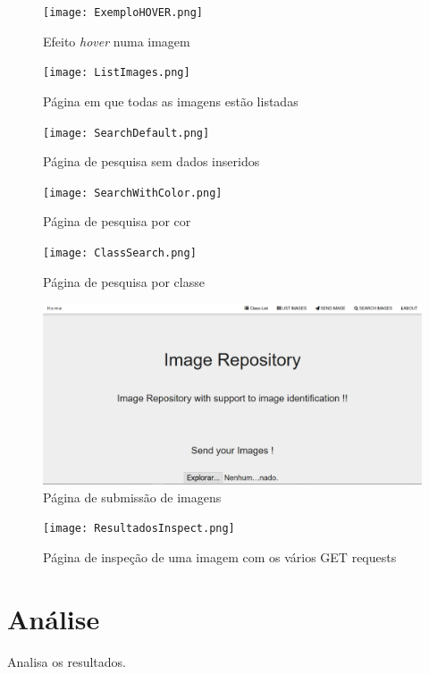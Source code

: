 \documentclass{report}
\begin{document}
\begin{figure}[h]
\texttt{[image: ExemploHOVER.png]}
\caption{Efeito \textit{hover} numa imagem}
\label{Fig4}
\end{figure}

\begin{figure}[h]
\texttt{[image: ListImages.png]}
\caption{Página em que todas as imagens estão listadas}
\label{Fig5}
\end{figure}


\begin{figure}[h]
\texttt{[image: SearchDefault.png]}
\caption{Página de pesquisa sem dados inseridos}
\label{Fig6}
\end{figure}

\begin{figure}[h]
\texttt{[image: SearchWithColor.png]}
\caption{Página de pesquisa por cor}
\label{Fig7}
\end{figure}

\begin{figure}[h]
\texttt{[image: ClassSearch.png]}
\caption{Página de pesquisa por classe}
\label{Fig8}
\end{figure}

\begin{figure}[h]
\includegraphics[width=\textwidth]{Send.png}
\caption{Página de submissão de imagens}
\label{Fig9}
\end{figure}

\begin{figure}[h]
\texttt{[image: ResultadosInspect.png]}
\caption{Página de inspeção de uma imagem com os vários GET requests}
\label{Fig10}
\end{figure}

\chapter{Análise}
\label{chap.analise}
Analisa os resultados.
\end{document}
